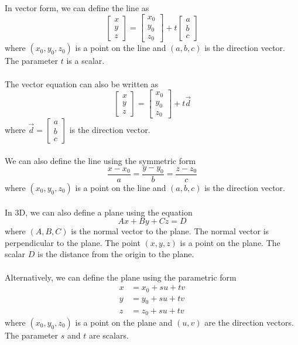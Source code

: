 \documentclass{article}
\begin{document}
In vector form, we can define the line as
\[
    \begin{bmatrix}
        x \\ y \\ z
    \end{bmatrix} = \begin{bmatrix}
        x_0 \\ y_0 \\ z_0
    \end{bmatrix} + t \begin{bmatrix}
        a \\ b \\ c
    \end{bmatrix}
\]
where $(x_0, y_0, z_0)$ is a point on the line and $(a, b, c)$ is the direction vector. The parameter $t$ is a scalar. \\
\\
The vector equation can also be written as
\[
    \begin{bmatrix}
        x \\ y \\ z
    \end{bmatrix} = \begin{bmatrix}
        x_0 \\ y_0 \\ z_0
    \end{bmatrix} + t \vec{d}
\]
where $\vec{d} = \begin{bmatrix}
    a \\ b \\ c
\end{bmatrix}$ is the direction vector. \\
\\
We can also define the line using the symmetric form
\[
    \frac{x - x_0}{a} = \frac{y - y_0}{b} = \frac{z - z_0}{c}
\]
where $(x_0, y_0, z_0)$ is a point on the line and $(a, b, c)$ is the direction vector. \\
\\
In 3D, we can also define a plane using the equation
\[
    Ax + By + Cz = D
\]
where $(A, B, C)$ is the normal vector to the plane. The normal vector is perpendicular to the plane. The point $(x, y, z)$ is a point on the plane. The scalar $D$ is the distance from the origin to the plane. \\
\\
Alternatively, we can define the plane using the parametric form
\[
    \begin{aligned}
        x &= x_0 + su + tv \\
        y &= y_0 + su + tv \\
        z &= z_0 + su + tv
    \end{aligned}
\]
where $(x_0, y_0, z_0)$ is a point on the plane and $(u, v)$ are the direction vectors. The parameter $s$ and $t$ are scalars. \\
\\
\end{document}
